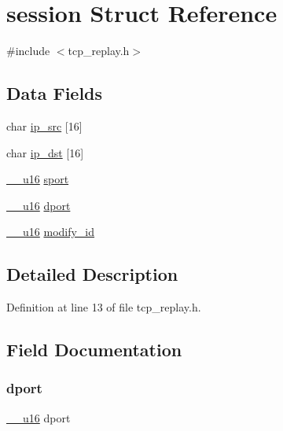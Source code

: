 \hypertarget{structsession}{}\section{session Struct Reference}
\label{structsession}


{\ttfamily \#include $<$tcp\+\_\+replay.\+h$>$}

\subsection*{Data Fields}
\begin{DoxyCompactItemize}
\item 
char \hyperlink{structsession_afd2c9d1acf6d5aeebaf414b8d0c781dc}{ip\+\_\+src} \mbox{[}16\mbox{]}
\item 
char \hyperlink{structsession_a26569f16f1e89a255280f1547a056ee1}{ip\+\_\+dst} \mbox{[}16\mbox{]}
\item 
\hyperlink{asm__types_8h_abc70358187152575fd05fbf6d253151f}{\+\_\+\+\_\+u16} \hyperlink{structsession_a5932845efeeab2e1c9720ebebe6bb87c}{sport}
\item 
\hyperlink{asm__types_8h_abc70358187152575fd05fbf6d253151f}{\+\_\+\+\_\+u16} \hyperlink{structsession_a9ff52b16b68df839c89d7b8f51fe7259}{dport}
\item 
\hyperlink{asm__types_8h_abc70358187152575fd05fbf6d253151f}{\+\_\+\+\_\+u16} \hyperlink{structsession_abd86bc9fbe91c70dbf358b176f8791aa}{modify\+\_\+id}
\end{DoxyCompactItemize}


\subsection{Detailed Description}


Definition at line 13 of file tcp\+\_\+replay.\+h.



\subsection{Field Documentation}
\mbox{\label{structsession_a9ff52b16b68df839c89d7b8f51fe7259}} 
\subsubsection{\texorpdfstring{dport}{dport}}
{\footnotesize\ttfamily \hyperlink{asm__types_8h_abc70358187152575fd05fbf6d253151f}{\+\_\+\+\_\+u16} dport}



